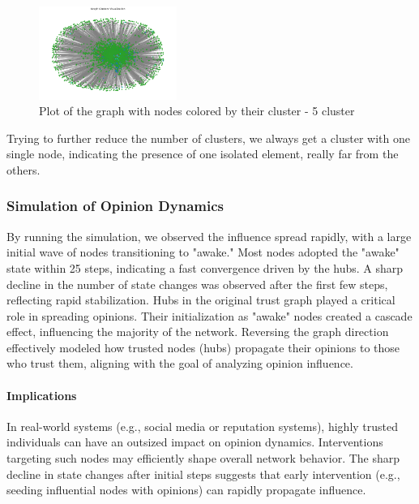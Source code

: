 \documentclass[conference]{IEEEtran}
\begin{document}
\begin{figure}[H]
    \centerline{\includegraphics[width=0.4\textwidth]{img/graph_5_cluster_visualization.png}}
    \centering
    \caption{Plot of the graph with nodes colored by their cluster - 5 cluster}
    \label{fig:5_cluster_graph_plot}
\end{figure}

Trying to further reduce the number of clusters, we always get a cluster with one single node, indicating the presence of one isolated element, really far from the others.

\subsubsection{Simulation of Opinion Dynamics}
By running the simulation, we observed the influence spread rapidly, with a large initial wave of nodes transitioning to "awake." Most nodes adopted the "awake" state within 25 steps, indicating a fast convergence driven by the hubs. A sharp decline in the number of state changes was observed after the first few steps, reflecting rapid stabilization.
Hubs in the original trust graph played a critical role in spreading opinions. Their initialization as "awake" nodes created a cascade effect, influencing the majority of the network. Reversing the graph direction effectively modeled how trusted nodes (hubs) propagate their opinions to those who trust them, aligning with the goal of analyzing opinion influence.

\paragraph{Implications}
In real-world systems (e.g., social media or reputation systems), highly trusted individuals can have an outsized impact on opinion dynamics. Interventions targeting such nodes may efficiently shape overall network behavior.
The sharp decline in state changes after initial steps suggests that early intervention (e.g., seeding influential nodes with opinions) can rapidly propagate influence.
\end{document}
